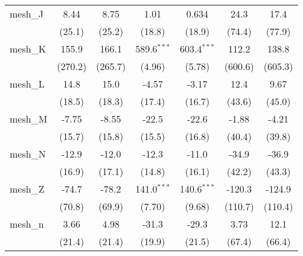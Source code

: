 \begin{tabular}{lcccccc}
   mesh\_J                                                     & 8.44         & 8.75         & 1.01           & 0.634          & 24.3    & 17.4\\   
                                                               & (25.1)       & (25.2)       & (18.8)         & (18.9)         & (74.4)  & (77.9)\\   
   mesh\_K                                                     & 155.9        & 166.1        & 589.6$^{***}$  & 603.4$^{***}$  & 112.2   & 138.8\\   
                                                               & (270.2)      & (265.7)      & (4.96)         & (5.78)         & (600.6) & (605.3)\\   
   mesh\_L                                                     & 14.8         & 15.0         & -4.57          & -3.17          & 12.4    & 9.67\\   
                                                               & (18.5)       & (18.3)       & (17.4)         & (16.7)         & (43.6)  & (45.0)\\   
   mesh\_M                                                     & -7.75        & -8.55        & -22.5          & -22.6          & -1.88   & -4.21\\   
                                                               & (15.7)       & (15.8)       & (15.5)         & (16.8)         & (40.4)  & (39.8)\\   
   mesh\_N                                                     & -12.9        & -12.0        & -12.3          & -11.0          & -34.9   & -36.9\\   
                                                               & (16.9)       & (17.1)       & (14.8)         & (16.1)         & (42.2)  & (43.3)\\   
   mesh\_Z                                                     & -74.7        & -78.2        & 141.0$^{***}$  & 140.6$^{***}$  & -120.3  & -124.9\\   
                                                               & (70.8)       & (69.9)       & (7.70)         & (9.68)         & (110.7) & (110.4)\\   
   mesh\_n                                                     & 3.66         & 4.98         & -31.3          & -29.3          & 3.73    & 12.1\\   
                                                               & (21.4)       & (21.4)       & (19.9)         & (21.5)         & (67.4)  & (66.4)\\   

\end{tabular}
